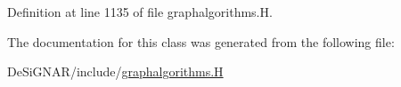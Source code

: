 Definition at line 1135 of file graphalgorithms.\+H.



The documentation for this class was generated from the following file\+:\begin{DoxyCompactItemize}
\item 
De\+Si\+G\+N\+A\+R/include/\hyperlink{graphalgorithms_8_h}{graphalgorithms.\+H}\end{DoxyCompactItemize}
